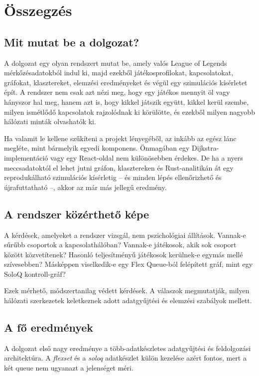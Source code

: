 \chapter{Összegzés}

\section{Mit mutat be a dolgozat?}

A dolgozat egy olyan rendszert mutat be, amely valós League of Legends mérkőzésadatokból indul ki, majd ezekből játékosprofilokat, kapcsolatokat, gráfokat, klasztereket, elemzési eredményeket és végül egy szimulációs kísérletet épít. A rendszer nem csak azt nézi meg, hogy egy játékos mennyit öl vagy hányszor hal meg, hanem azt is, hogy kikkel játszik együtt, kikkel kerül szembe, milyen ismétlődő kapcsolatok rajzolódnak ki körülötte, és ezekből milyen nagyobb hálózati minták olvashatók ki.

Ha valamit le kellene szűkíteni a projekt lényegéből, az inkább az egész lánc megléte, mint bármelyik egyedi komponens. Önmagában egy Dijkstra-implementáció vagy egy React-oldal nem különösebben érdekes. De ha a nyers meccsadatoktól el lehet jutni gráfon, klasztereken és Rust-analitikán át egy reprodukálható szimulációs kísérletig -- és minden lépés ellenőrizhető és újrafuttatható --, akkor az már más jellegű eredmény.

\section{A rendszer közérthető képe}

A kérdések, amelyeket a rendszer vizsgál, nem pszichológiai állítások. Vannak-e sűrűbb csoportok a kapcsolathálóban? Vannak-e játékosok, akik sok csoport között közvetítenek? Hasonló teljesítményű játékosok kerülnek-e egymás mellé szívesebben? Másképpen viselkedik-e egy Flex Queue-ból felépített gráf, mint egy SoloQ kontroll-gráf?

Ezek mérhető, módszertanilag védett kérdések. A válaszok megmutatják, milyen hálózati szerkezetek keletkeznek adott adatgyűjtési és elemzési szabályok mellett.

\section{A fő eredmények}

A dolgozat első nagy eredménye a több-adatkészletes adatgyűjtési és feldolgozási architektúra. A \textit{flexset} és a \textit{soloq} adatkészlet külön kezelése azért fontos, mert a két queue nem ugyanazt a jelenséget méri.

